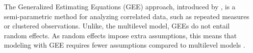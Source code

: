 \documentclass[stu]{apa7}
\begin{document}

The Generalized Estimating Equations (GEE) approach, introduced by \textcite{liang_longitudinal_1986}, is a semi-parametric method for analyzing correlated data, such as repeated measures or clustered observations. Unlike, the multilevel model, GEEs do not entail random effects. As random effects impose extra assumptions, this means that modeling with GEE requires fewer assumptions compared to multilevel models \parencite[]{mcneish_measurement_2021}.
\end{document}
